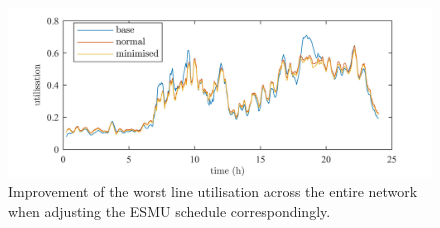 \begin{figure}\centering
	\includegraphics{_chapter1/fig/results/ts-all-line-utilisation_}
\caption{Improvement of the worst line utilisation across the entire network when adjusting the ESMU schedule correspondingly.}
\label{ch1:fig:ts-all-line-utilisation}
\end{figure}